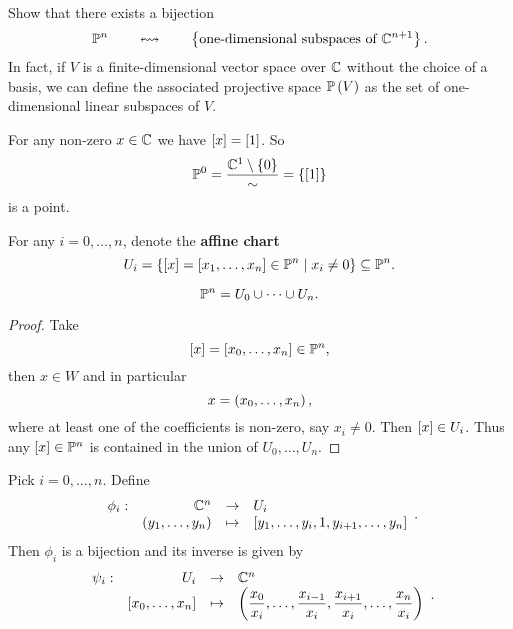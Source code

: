 \begin{exercise}
Show that there exists a bijection
$$ \P^n \qquad \leftrightsquigarrow \qquad \cb{\text{one-dimensional subspaces of} \ \C^{n + 1}}. $$
In fact, if $ V $ is a finite-dimensional vector space over $ \C $ without the choice of a basis, we can define the associated projective space $ \P\rb{V} $ as the set of one-dimensional linear subspaces of $ V $.
\end{exercise}

\begin{example}
For any non-zero $ x \in \C $ we have $ \sb{x} = \sb{1} $. So
$$ \P^0 = \dfrac{\C^1 \setminus \cb{0}}{\sim} = \cb{\sb{1}} $$
is a point.
\end{example}

\pagebreak

\begin{notation}
For any $ i = 0, \dots, n $, denote the \textbf{affine chart}
$$ U_i = \cb{\sb{x} = \sb{x_1, \dots, x_n} \in \P^n \mid x_i \ne 0} \subseteq \P^n. $$
\end{notation}

\begin{lemma}
\label{lem:3.9}
$$ \P^n = U_0 \cup \dots \cup U_n. $$
\end{lemma}

\begin{proof}
Take
$$ \sb{x} = \sb{x_0, \dots, x_n} \in \P^n, $$
then $ x \in W $ and in particular
$$ x = \rb{x_0, \dots, x_n}, $$
where at least one of the coefficients is non-zero, say $ x_i \ne 0 $. Then $ \sb{x} \in U_i $. Thus any $ \sb{x} \in \P^n $ is contained in the union of $ U_0, \dots, U_n $.
\end{proof}

\begin{lemma}
\label{lem:3.10}
Pick $ i = 0, \dots, n $. Define
$$ \function[\phi_i]{\C^n}{U_i}{\rb{y_1, \dots, y_n}}{\sb{y_1, \dots, y_i, 1, y_{i + 1}, \dots, y_n}}. $$
Then $ \phi_i $ is a bijection and its inverse is given by
$$ \function[\psi_i]{U_i}{\C^n}{\sb{x_0, \dots, x_n}}{\rb{\dfrac{x_0}{x_i}, \dots, \dfrac{x_{i - 1}}{x_i}, \dfrac{x_{i + 1}}{x_i}, \dots, \dfrac{x_n}{x_i}}}. $$
\end{lemma}

